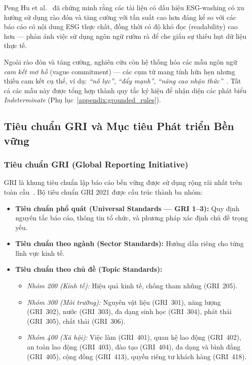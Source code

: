 Peng Hu et al.~\cite{su16062571} đã chứng minh rằng các tài liệu có dấu hiệu ESG-washing có xu hướng sử dụng rào đón và tăng cường với tần suất cao hơn đáng kể so với các báo cáo có nội dung ESG thực chất, đồng thời có độ khó đọc (readability) cao hơn --- phản ánh việc sử dụng ngôn ngữ rườm rà để che giấu sự thiếu hụt dữ liệu thực tế.

Ngoài rào đón và tăng cường, nghiên cứu còn hệ thống hóa các mẫu ngôn ngữ \textit{cam kết mơ hồ} (vague commitment) --- các cụm từ mang tính hứa hẹn nhưng thiếu cam kết cụ thể, ví dụ: \textit{``nỗ lực''}, \textit{``đẩy mạnh''}, \textit{``nâng cao nhận thức''}~\cite{florstedt2025detecting}. Tất cả các mẫu này được tổng hợp thành quy tắc ký hiệu để nhận diện các phát biểu \textit{Indeterminate} (Phụ lục~\ref{appendix:grounded_rules}).


\subsection{Tiêu chuẩn GRI và Mục tiêu Phát triển Bền vững}
\label{subsec:gri}

\subsubsection{Tiêu chuẩn GRI (Global Reporting Initiative)}

GRI là khung tiêu chuẩn lập báo cáo bền vững được sử dụng rộng rãi nhất trên toàn cầu~\cite{gri2021gri}. Bộ tiêu chuẩn GRI 2021 được cấu trúc thành ba nhóm:

\begin{itemize}
    \item \textbf{Tiêu chuẩn phổ quát (Universal Standards --- GRI 1--3):} Quy định nguyên tắc báo cáo, thông tin tổ chức, và phương pháp xác định chủ đề trọng yếu.
    \item \textbf{Tiêu chuẩn theo ngành (Sector Standards):} Hướng dẫn riêng cho từng lĩnh vực kinh tế.
    \item \textbf{Tiêu chuẩn theo chủ đề (Topic Standards):}
    \begin{itemize}
        \item \textit{Nhóm 200 (Kinh tế):} Hiệu quả kinh tế, chống tham nhũng (GRI~205).
        \item \textit{Nhóm 300 (Môi trường):} Nguyên vật liệu (GRI~301), năng lượng (GRI~302), nước (GRI~303), đa dạng sinh học (GRI~304), phát thải (GRI~305), chất thải (GRI~306).
        \item \textit{Nhóm 400 (Xã hội):} Việc làm (GRI~401), quan hệ lao động (GRI~402), an toàn lao động (GRI~403), đào tạo (GRI~404), đa dạng và bình đẳng (GRI~405), cộng đồng (GRI~413), quyền riêng tư khách hàng (GRI~418).
    \end{itemize}
\end{itemize}

